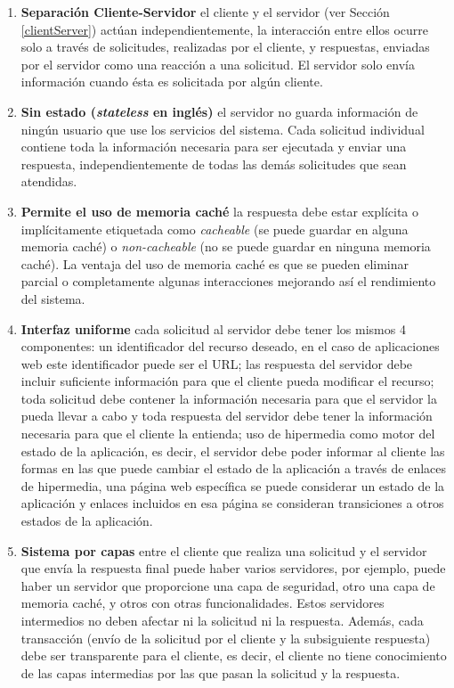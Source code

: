     \begin{enumerate}
        \item \textbf{Separación Cliente-Servidor} el cliente y el servidor (ver Sección \ref{clientServer}) actúan independientemente, la interacción entre ellos ocurre solo a través de solicitudes, realizadas por el cliente, y respuestas, enviadas por el servidor como una reacción a una solicitud. El servidor solo envía información cuando ésta es solicitada por algún cliente.
        \item \textbf{Sin estado (\emph{stateless} en inglés)} el servidor no guarda información de ningún usuario que use los servicios del sistema. Cada solicitud individual contiene toda la información necesaria para ser ejecutada y enviar una respuesta, independientemente de todas las demás solicitudes que sean atendidas.
        \item \textbf{Permite el uso de memoria caché} la respuesta debe estar explícita o implícitamente etiquetada como \textit{cacheable} (se puede guardar en alguna memoria caché) o \textit{non-cacheable} (no se puede guardar en ninguna memoria caché). La ventaja del uso de memoria caché es que se pueden eliminar parcial o completamente algunas interacciones mejorando así el rendimiento del sistema.
        \item \textbf{Interfaz uniforme} cada solicitud al servidor debe tener los mismos 4 componentes: un identificador del recurso deseado, en el caso de aplicaciones web este identificador puede ser el URL; las respuesta del servidor debe incluir suficiente información para que el cliente pueda modificar el recurso; toda solicitud debe contener la información necesaria para que el servidor la pueda llevar a cabo y toda respuesta del servidor debe tener la información necesaria para que el cliente la entienda; uso de hipermedia como motor del estado de la aplicación, es decir, el servidor debe poder informar al cliente las formas en las que puede cambiar el estado de la aplicación a través de enlaces de hipermedia, una página web específica se puede considerar un estado de la aplicación y enlaces incluidos en esa página se consideran transiciones a otros estados de la aplicación.
        \item \textbf{Sistema por capas} entre el cliente que realiza una solicitud y el servidor que envía la respuesta final puede haber varios servidores, por ejemplo, puede haber un servidor que proporcione una capa de seguridad, otro una capa de memoria caché, y otros con otras funcionalidades. Estos servidores intermedios no deben afectar ni la solicitud ni la respuesta. Además, cada transacción (envío de la solicitud por el cliente y la subsiguiente respuesta) debe ser transparente para el cliente, es decir, el cliente no tiene conocimiento de las capas intermedias por las que pasan la solicitud y la respuesta.
    \end{enumerate}

